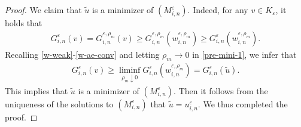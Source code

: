 \documentclass[12pt]{amsart}
\begin{document}
\begin{proof}
We claim that $\tilde{u}$ is a minimizer of $(M^{\varepsilon}_{i,n})$. 
Indeed, for any $v \in K_{\varepsilon}$, it holds that 
\begin{align} \label{pre-mini-1}
G^{\varepsilon}_{i,n}(v) = G^{{\varepsilon},\rho_{m}}_{i,n}(v) 
\ge G^{{\varepsilon},\rho_{m}}_{i,n}(w^{{\varepsilon},\rho_{m}}_{i,n}) 
\ge G^{\varepsilon}_{i,n}(w^{{\varepsilon},\rho_{m}}_{i,n}). 
\end{align}
Recalling \eqref{w-weak}-\eqref{w-ae-conv} and letting $\rho_{m} \to 0$ in \eqref{pre-mini-1}, we infer that 
\begin{align*} 
G^{\varepsilon}_{i,n}(v) \ge \liminf_{\rho_{m} \downarrow 0} G^{\varepsilon}_{i,n}(w^{{\varepsilon},\rho_{m}}_{i,n}) = G^{\varepsilon}_{i,n}(\tilde{u}). 
\end{align*}
This implies that $\tilde{u}$ is a minimizer of $(M^{\varepsilon}_{i,n})$. 
Then it follows from the uniqueness of the solutions to $(M^{\varepsilon}_{i,n})$ that $\tilde{u}= u^{\varepsilon}_{i,n}$. 
We thus completed the proof. 
\end{proof}
\end{document}
